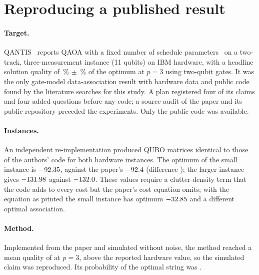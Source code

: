\documentclass[11pt,a4paper]{article}
\begin{document}
\section{Reproducing a published result}\label{sec:p3}

\paragraph{Target.} QANTIS~\cite{eker2026qantis} reports QAOA with a fixed number of schedule parameters~\cite{saavedra2025fpc} on a
two-track, three-measurement instance (11 qubits) on IBM hardware, with a headline solution quality of
\PthreePaperHeadline\,\% $\pm$ \PthreePaperHeadlineSD\,\% of the optimum at $p=3$ using \PthreePaperTwoQubitGates{} two-qubit gates. It was the only
gate-model data-association result with hardware data and public code found by the literature searches for this study. A plan registered four of its claims and four
added questions before any code; a source audit of the paper and its public repository preceded the experiments. Only the public code
was available.

\paragraph{Instances.} An independent re-implementation produced QUBO matrices identical to those of the authors' code for both
hardware instances. The optimum of the small instance is $-92.35$, against the paper's $-92.4$ (difference
\PthreeCOneDiff); the larger instance gives $-131.98$ against $-132.0$. These values require a clutter-density
term that the code adds to every cost but the paper's cost equation omits; with the equation as printed the small instance has optimum
$-32.85$ and a different optimal association.

\paragraph{Method.} Implemented from the paper and simulated without noise, the method reached a mean quality of \PthreeQualityA{} at $p=3$,
above the reported hardware value, so the simulated claim was reproduced. Its probability of the optimal string was \PthreePoptA.
\end{document}

